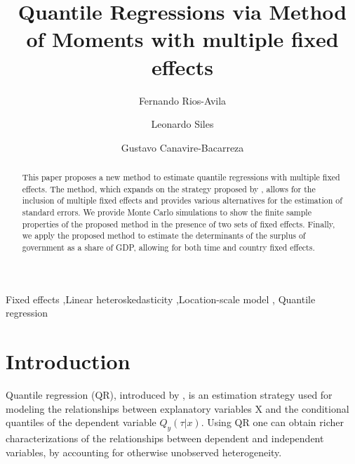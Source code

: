 \documentclass[
  authoryear,
  review,
  1p]{elsarticle}
\begin{document}
\begin{frontmatter}
\title{Quantile Regressions via Method of Moments with multiple fixed
effects }
\author[1]{Fernando Rios-Avila%
%
}
\author[2]{Leonardo Siles%
%
}
\author[3]{Gustavo Canavire-Bacarreza%
%
}





        
\begin{abstract}
This paper proposes a new method to estimate quantile regressions with
multiple fixed effects. The method, which expands on the strategy
proposed by \citet{mss2019}, allows for the inclusion of multiple fixed
effects and provides various alternatives for the estimation of standard
errors. We provide Monte Carlo simulations to show the finite sample
properties of the proposed method in the presence of two sets of fixed
effects. Finally, we apply the proposed method to estimate the
determinants of the surplus of government as a share of GDP, allowing
for both time and country fixed effects.
\end{abstract}





\begin{keyword}
    Fixed effects \sep Linear heteroskedasticity \sep Location-scale
model \sep 
    Quantile regression
\end{keyword}
\end{frontmatter}
    \ifdefined\Shaded\renewenvironment{Shaded}{\begin{tcolorbox}[borderline west={3pt}{0pt}{shadecolor}, breakable, frame hidden, interior hidden, enhanced, boxrule=0pt, sharp corners]}{\end{tcolorbox}}\fi

\hypertarget{introduction}{%
\section{Introduction}\label{introduction}}

Quantile regression (QR), introduced by \citet{koenkerbasset1978}, is an
estimation strategy used for modeling the relationships between
explanatory variables X and the conditional quantiles of the dependent
variable \(Q_y (\tau|x)\). Using QR one can obtain richer
characterizations of the relationships between dependent and independent
variables, by accounting for otherwise unobserved heterogeneity.
\end{document}
